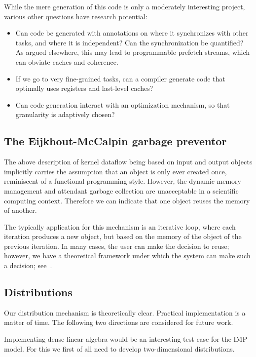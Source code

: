 \documentclass[11pt,fleqn,preprint]{impreport}
\begin{document}
While the mere generation of this code is only a moderately interesting project,
various other questions have research potential:
\begin{itemize}
\item Can code be generated with annotations on where it synchronizes with other tasks,
  and where it is independent? Can the synchronization be quantified? As argued elsewhere,
  this may lead to programmable prefetch streams, which can obviate caches and coherence.
\item If we go to very fine-grained tasks, can a compiler generate code that optimally
  uses registers and last-level caches?
\item Can code generation interact with an optimization mechanism, so that granularity
  is adaptively chosen?
\end{itemize}

\subsection{The Eijkhout-McCalpin garbage preventor}
\label{sec:garbage}

The above description of kernel dataflow being based on input and output objects
implicitly carries the assumption that an object is only ever created once,
reminiscent of a functional programming style.
However, the dynamic memory management and attendant garbage collection
are unacceptable in a scientific computing context. Therefore we can indicate
that one object reuses the memory of another.

The typically application for this mechanism is an iterative loop, where
each iteration produces a new object, but based on the memory of the object
of the previous iteration. In many cases, the user can make the decision to
reuse; however, we have a theoretical framework under which the system can
make such a decision; see~.

\subsection{Distributions}

Our distribution mechanism is theoretically clear. Practical implementation
is a matter of time. The following two directions are considered
for future work.

Implementing dense linear algebra would be an interesting test case
for the IMP model. For this we first of all need to develop
two-dimensional distributions.
\end{document}
